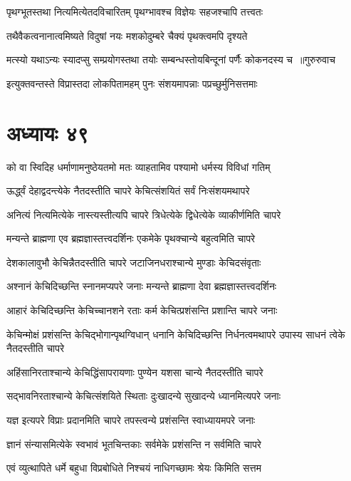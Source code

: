 \twolineshloka
{पृथग्भूतस्तथा नित्यमित्येतदविचारितम्}
{पृथग्भावश्च विज्ञेयः सहजश्चापि तत्त्वतः}


\twolineshloka
{तथैवैकत्वनानात्वमिष्यते विदुषां नयः}
{मशकोदुम्बरे चैक्यं पृथक्त्वमपि दृश्यते}


\threelineshloka
{मत्स्यो यथाऽन्यः स्यादप्सु सम्प्रयोगस्तथा तयोः}
{सम्बन्धस्तोयबिन्दूनां पर्णैः कोकनदस्य च ॥गुरुरुवाच}
{}


\twolineshloka
{इत्युक्तवन्तस्ते विप्रास्तदा लोकपितामहम्}
{पुनः संशयमापन्नाः पप्रच्छुर्मुनिसत्तमाः}


\chapter{अध्यायः ४९}
\twolineshloka
{को वा स्विदिह धर्माणामनुष्ठेयतमो मतः}
{व्याहतामिव पश्यामो धर्मस्य विविधां गतिम्}


\twolineshloka
{ऊर्द्ध्वं देहाद्वदन्त्येके नैतदस्तीति चापरे}
{केचित्संशयितं सर्वं निःसंशयमथापरे}


\twolineshloka
{अनित्यं नित्यमित्येके नास्त्यस्तीत्यपि चापरे}
{त्रिधेत्येके द्विधेत्येके व्याकीर्णमिति चापरे}


\twolineshloka
{मन्यन्ते ब्राह्मणा एव ब्रह्मज्ञास्तत्त्वदर्शिनः}
{एकमेके पृथक्चान्ये बहुत्वमिति चापरे}


\twolineshloka
{देशकालावुभौ केचिन्नैतदस्तीति चापरे}
{जटाजिनधराश्चान्ये मुण्डाः केचिदसंवृताः}


\twolineshloka
{अश्नानं केचिदिच्छन्ति स्नानमप्यपरे जनाः}
{मन्यन्ते ब्राह्मणा देवा ब्रह्मज्ञास्तत्त्वदर्शिनः}


\twolineshloka
{आहारं केचिदिच्छन्ति केचिच्चानशने रताः}
{कर्म केचित्प्रशंसन्ति प्रशान्ति चापरे जनाः}


\threelineshloka
{केचिन्मोक्षं प्रशंसन्ति केचिद्भोगान्पृथग्विधान्}
{धनानि केचिदिच्छन्ति निर्धनत्वमथापरे}
{उपास्य साधनं त्वेके नैतदस्तीति चापरे}


\twolineshloka
{अहिंसानिरताश्चान्ये केचिद्धिंसापरायणाः}
{पुण्येन यशसा चान्ये नैतदस्तीति चापरे}


\twolineshloka
{सद्भावनिरताश्चान्ये केचित्संशयिते स्थिताः}
{दुःखादन्ये सुखादन्ये ध्यानमित्यपरे जनाः}


\twolineshloka
{यज्ञ इत्यपरे विप्राः प्रदानमिति चापरे}
{तपस्त्वन्ये प्रशंसन्ति स्वाध्यायमपरे जनाः}


\twolineshloka
{ज्ञानं संन्यासमित्येके स्वभावं भूतचिन्तकाः}
{सर्वमेके प्रशंसन्ति न सर्वमिति चापरे}


\twolineshloka
{एवं व्युत्थापिते धर्मे बहुधा विप्रबोधिते}
{निश्चयं नाधिगच्छामः श्रेयः किमिति सत्तम}


